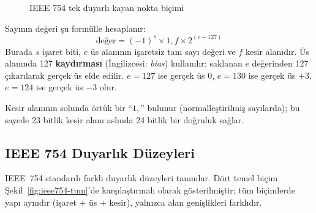 \begin{figure}[H]
\centering
{}
\caption{IEEE 754 tek duyarlı kayan nokta biçimi}
\label{fig:ieee754-tek}
\end{figure}

Sayının değeri şu formülle hesaplanır:
\begin{equation}
\text{değer} = (-1)^s \times 1{,}f \times 2^{(e - 127)}
\label{eq:ieee754}
\end{equation}
Burada $s$ işaret biti, $e$ üs alanının işaretsiz tam sayı değeri ve $f$ kesir alanıdır. Üs alanında 127 \textbf{kaydırması} (İngilizcesi: \textit{bias}) kullanılır: saklanan $e$ değerinden 127 çıkarılarak gerçek üs elde edilir. $e = 127$ ise gerçek üs $0$, $e = 130$ ise gerçek üs $+3$, $e = 124$ ise gerçek üs $-3$ olur.

Kesir alanının solunda örtük bir ``$1,$'' bulunur (normalleştirilmiş sayılarda); bu sayede 23 bitlik kesir alanı aslında 24 bitlik bir doğruluk sağlar.

\subsection{IEEE 754 Duyarlık Düzeyleri}
\label{sec:ekA-ieee754-duzeyler}

IEEE~754 standardı farklı duyarlık düzeyleri tanımlar. Dört temel biçim Şekil~\ref{fig:ieee754-tum}'de karşılaştırmalı olarak gösterilmiştir; tüm biçimlerde yapı aynıdır (işaret $+$ üs $+$ kesir), yalnızca alan genişlikleri farklıdır.

